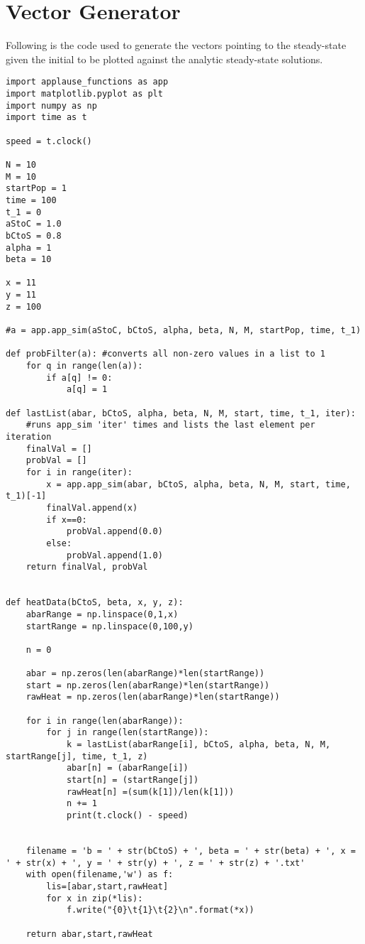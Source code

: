 \chapter{Vector Generator}
\label{apndx:vectsim}

Following is the code used to generate the vectors pointing to the steady-state given the initial to be plotted against the analytic steady-state solutions.

\begin{lstlisting}
import applause_functions as app
import matplotlib.pyplot as plt
import numpy as np
import time as t

speed = t.clock()

N = 10
M = 10
startPop = 1
time = 100
t_1 = 0
aStoC = 1.0
bCtoS = 0.8 
alpha = 1
beta = 10

x = 11
y = 11
z = 100

#a = app.app_sim(aStoC, bCtoS, alpha, beta, N, M, startPop, time, t_1)

def probFilter(a): #converts all non-zero values in a list to 1
    for q in range(len(a)):
        if a[q] != 0:
            a[q] = 1

def lastList(abar, bCtoS, alpha, beta, N, M, start, time, t_1, iter): 
    #runs app_sim 'iter' times and lists the last element per iteration
    finalVal = []
    probVal = []
    for i in range(iter):
        x = app.app_sim(abar, bCtoS, alpha, beta, N, M, start, time, t_1)[-1]
        finalVal.append(x)
        if x==0:
            probVal.append(0.0)
        else:
            probVal.append(1.0)
    return finalVal, probVal
    
    
def heatData(bCtoS, beta, x, y, z):
    abarRange = np.linspace(0,1,x)
    startRange = np.linspace(0,100,y)  
    
    n = 0
    
    abar = np.zeros(len(abarRange)*len(startRange))
    start = np.zeros(len(abarRange)*len(startRange))
    rawHeat = np.zeros(len(abarRange)*len(startRange))
        
    for i in range(len(abarRange)):
        for j in range(len(startRange)):
            k = lastList(abarRange[i], bCtoS, alpha, beta, N, M, startRange[j], time, t_1, z)
            abar[n] = (abarRange[i])
            start[n] = (startRange[j])
            rawHeat[n] =(sum(k[1])/len(k[1]))
            n += 1
            print(t.clock() - speed)
            
    
    filename = 'b = ' + str(bCtoS) + ', beta = ' + str(beta) + ', x = ' + str(x) + ', y = ' + str(y) + ', z = ' + str(z) + '.txt'    
    with open(filename,'w') as f:
        lis=[abar,start,rawHeat]
        for x in zip(*lis):
            f.write("{0}\t{1}\t{2}\n".format(*x))        
            
    return abar,start,rawHeat
\end{lstlisting}
